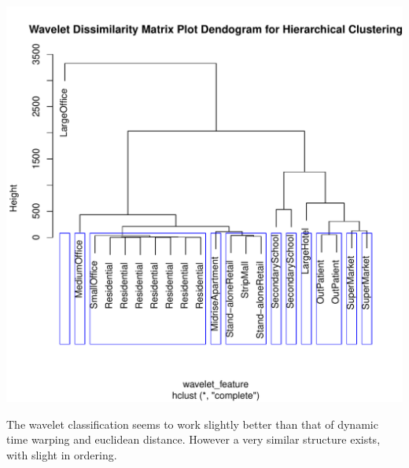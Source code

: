 \documentclass[12pt]{article}\usepackage[]{graphicx}\usepackage[]{color}
\makeatletter
\def\maxwidth{ %
  \ifdim\Gin@nat@width>\linewidth
    \linewidth
  \else
    \Gin@nat@width
  \fi
}
\newenvironment{knitrout}{}{} %
\makeatother
\begin{document}
\begin{knitrout}
\color{fgcolor}
\includegraphics[width=\maxwidth]{figure/wavelet_diss-1} 

\end{knitrout}

The wavelet classification seems to work slightly better than that of dynamic time warping and euclidean distance. However a very similar structure exists, with slight in ordering.







\end{document}
